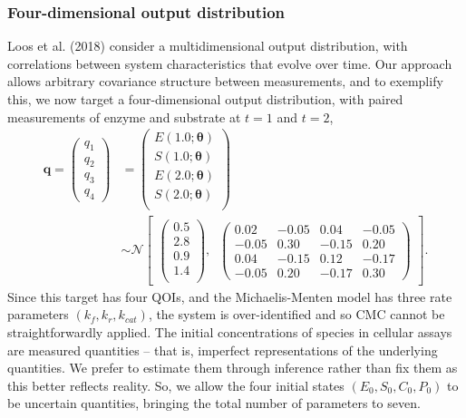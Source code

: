 \subsubsection{Four-dimensional output distribution}\label{sec:4D}
Loos et al. (2018) consider a multidimensional output distribution, with correlations between system characteristics that evolve over time. Our approach allows arbitrary covariance structure between measurements, and to exemplify this, we now target a four-dimensional output distribution, with paired measurements of enzyme and substrate at $t=1$ and $t=2$,
%
\begin{equation}\label{eq:MM_4d_output}
\begin{aligned}
\boldsymbol{q} = \begin{pmatrix} q_1 \\ q_2 \\ q_3 \\ q_4 \end{pmatrix} &=
\begin{pmatrix}
E(1.0; \boldsymbol{\theta})\\
S(1.0; \boldsymbol{\theta})\\
E(2.0; \boldsymbol{\theta})\\
S(2.0; \boldsymbol{\theta})\\
\end{pmatrix}
\\
&\sim  \mathcal{N}
\begin{bmatrix}
\begin{pmatrix}
0.5\\
2.8\\
0.9\\
1.4\\
\end{pmatrix}, \;\;
\begin{pmatrix}
0.02 &  -0.05 &  0.04 & -0.05\\
-0.05 & 0.30  & -0.15 & 0.20\\
0.04 & -0.15  & 0.12  &  -0.17\\
-0.05 & 0.20 & -0.17 & 0.30
\end{pmatrix}
\end{bmatrix}.
\end{aligned}
\end{equation}
%
Since this target has four QOIs, and the Michaelis-Menten model has three rate parameters $(k_f,k_r,k_{cat})$, the system is over-identified and so CMC cannot be straightforwardly applied. The initial concentrations of species in cellular assays are measured quantities -- that is, imperfect representations of the underlying quantities. We prefer to estimate them through inference rather than fix them as this better reflects reality. So, we allow the four initial states $(E_0, S_0, C_0, P_0)$ to be uncertain quantities, bringing the total number of parameters to seven. 

